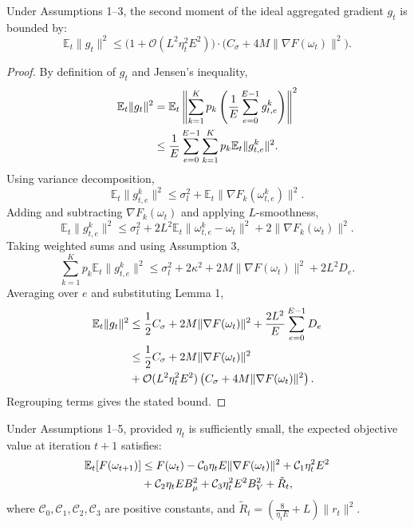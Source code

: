 \begin{lemma}
Under Assumptions 1--3, the second moment of the ideal aggregated gradient $g_t$ is bounded by:
\begin{equation}
\mathbb{E}_t\|g_t\|^2 \le \big(1 + \mathcal{O}(L^2 \eta_t^2 E^2)\big) \cdot \Big( C_\sigma + 4M\|\nabla F(\omega_t)\|^2 \Big).
\end{equation}
\end{lemma}

\begin{proof}
By definition of $g_t$ and Jensen's inequality,
\begin{align}
\mathbb{E}_t\|g_t\|^2 &= \mathbb{E}_t\left\| \sum_{k=1}^K p_k \left( \frac{1}{E} \sum_{e=0}^{E-1} g_{t,e}^k \right) \right\|^2 \notag \\
&\le \frac{1}{E} \sum_{e=0}^{E-1} \sum_{k=1}^K p_k \mathbb{E}_t\|g_{t,e}^k\|^2.
\end{align}
Using variance decomposition,
\begin{equation}
\mathbb{E}_t\|g_{t,e}^k\|^2 \le \sigma_l^2 + \mathbb{E}_t\|\nabla F_k(\omega_{t,e}^k)\|^2.
\end{equation}
Adding and subtracting $\nabla F_k(\omega_t)$ and applying $L$-smoothness,
\begin{equation}
\mathbb{E}_t\|g_{t,e}^k\|^2 \le \sigma_l^2 + 2L^2\mathbb{E}_t\|\omega_{t,e}^k - \omega_t\|^2 + 2\|\nabla F_k(\omega_t)\|^2.
\end{equation}
Taking weighted sums and using Assumption 3,
\begin{equation}
\sum_{k=1}^K p_k \mathbb{E}_t\|g_{t,e}^k\|^2
\le \sigma_l^2 + 2\kappa^2 + 2M\|\nabla F(\omega_t)\|^2 + 2L^2 D_e.
\end{equation}
Averaging over $e$ and substituting Lemma 1,
\begin{align}
\mathbb{E}_t\|g_t\|^2 &\le \frac{1}{2}C_\sigma + 2M\|\nabla F(\omega_t)\|^2 + \frac{2L^2}{E} \sum_{e=0}^{E-1} D_e \\
&\le \frac{1}{2}C_\sigma + 2M\|\nabla F(\omega_t)\|^2 \notag \\
&+ \mathcal{O}(L^2 \eta_t^2 E^2) \left( C_\sigma + 4M\|\nabla F(\omega_t)\|^2 \right).
\end{align}
Regrouping terms gives the stated bound.
\end{proof}

\begin{lemma}
Under Assumptions 1--5, provided $\eta_t$ is sufficiently small, the expected objective value at iteration $t+1$ satisfies:
\begin{align}
\mathbb{E}_t[F(\omega_{t+1})] &\le F(\omega_t) - \mathcal{C}_0 \eta_t E \|\nabla F(\omega_t)\|^2 + \mathcal{C}_1 \eta_t^2 E^2 \notag \\
& + \mathcal{C}_2 \eta_t E B_\mu^2 + \mathcal{C}_3 \eta_t^2 E^2 B_V^2 + \tilde{R}_t,
\end{align}
where $\mathcal{C}_0, \mathcal{C}_1, \mathcal{C}_2, \mathcal{C}_3$ are positive constants, and $\tilde{R}_t = \left(\frac{8}{\eta_t E} + L\right)\|r_t\|^2$.
\end{lemma}

